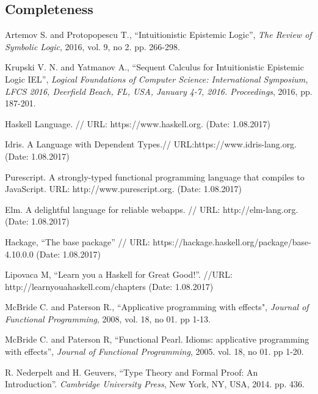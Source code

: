 \documentclass[a4paper]{article}
\begin{document}
\subsection{Completeness}


  \begin{thebibliography}{}

   Artemov S. and Protopopescu T., \/ ``Intuitionistic Epistemic Logic'', \textit{The
  Review of Symbolic Logic}, 2016, vol. 9, no 2. pp. 266-298.\parskip=1mm

   Krupski V. N. and Yatmanov A., \/ ``Sequent Calculus for Intuitionistic Epistemic Logic
  IEL'', \textit{Logical Foundations of Computer Science: International Symposium, LFCS 2016, Deerfield
  Beach, FL, USA, January 4-7, 2016. Proceedings}, 2016, pp. 187-201.\parskip=1mm

   Haskell Language. // URL: https://www.haskell.org. (Date: 1.08.2017) \parskip=1mm

   Idris. A Language with Dependent Types.// URL:https://www.idris-lang.org. (Date:
  1.08.2017) \parskip=1mm

   Purescript. A strongly-typed functional programming language that compiles to JavaScript.
  URL: http://www.purescript.org. (Date: 1.08.2017) \parskip=1mm

   Elm. A delightful language for reliable webapps. // URL: http://elm-lang.org. (Date:
  1.08.2017) \parskip=1mm

   Hackage, \/ ``The base package'' // URL: https://hackage.haskell.org/package/base-4.10.0.0
  (Date: 1.08.2017) \parskip=1mm

   Lipovaca M, \/ ``Learn you a Haskell for Great Good!''. //URL:
  http://learnyouahaskell.com/chapters (Date: 1.08.2017) \parskip=1mm

   McBride C. and Paterson R., ``Applicative programming with effects", \textit{Journal of
  Functional Programming}, 2008, vol. 18, no 01. pp 1-13. \parskip=1mm

   McBride C. and Paterson R, ``Functional Pearl. Idioms: applicative programming with
  effects'', \textit{Journal of Functional Programming}, 2005. vol. 18, no 01. pp 1-20. \parskip=1mm

   R. Nederpelt and H. Geuvers, ``Type Theory and Formal Proof: An Introduction''.
  \textit{Cambridge University Press}, New York, NY, USA, 2014. pp. 436. \parskip=1mm


\end{thebibliography}
\end{document}
